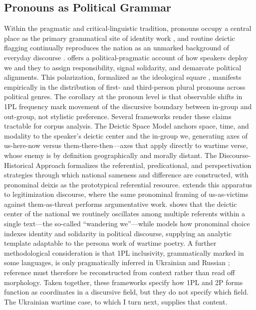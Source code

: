 \documentclass[12pt]{interact}
\theoremstyle{plain}%
\theoremstyle{definition}
\theoremstyle{remark}
\begin{document}
\subsection{Pronouns as Political Grammar}
Within the pragmatic and critical-linguistic tradition, pronouns occupy a central place as the primary grammatical site of identity work \citep{muhlhausler1990pronouns}, and routine deictic flagging continually reproduces the nation as an unmarked background of everyday discourse \citep{billig1995banal}. \citet{wilson1990politically} offers a political-pragmatic account of how speakers deploy we and they to assign responsibility, signal solidarity, and demarcate political alignments. This polarization, formalized as the ideological square \citep{vanDijk2011}, manifests empirically in the distribution of first- and third-person plural pronouns across political genres. The corollary at the pronoun level is that observable shifts in 1PL frequency mark movement of the discursive boundary between in-group and out-group, not stylistic preference.
Several frameworks render these claims tractable for corpus analysis. The Deictic Space Model \citep{chilton2004analysing} anchors space, time, and modality to the speaker's deictic center and the in-group we, generating axes of us-here-now versus them-there-then—axes that apply directly to wartime verse, whose enemy is by definition geographically and morally distant. The Discourse-Historical Approach \citep{wodak2009the} formalizes the referential, predicational, and perspectivation strategies through which national sameness and difference are constructed, with pronominal deixis as the prototypical referential resource. \citet{reyes2011strategies} extends this apparatus to legitimization discourse, where the same pronominal framing of us-as-victims against them-as-threat performs argumentative work. \citet{petersoo2007what} shows that the deictic center of the national we routinely oscillates among multiple referents within a single text—the so-called ``wandering we''—while \citet{fina1995pronominal} models how pronominal choice indexes identity and solidarity in political discourse, supplying an analytic template adaptable to the persona work of wartime poetry. A further methodological consideration is that 1PL inclusivity, grammatically marked in some languages, is only pragmatically inferred in Ukrainian and Russian \citep{cysouw2003the, filimonova2005clusivity, helmbrecht2002grammar}; reference must therefore be reconstructed from context rather than read off morphology. Taken together, these frameworks specify how 1PL and 2P forms function as coordinates in a discursive field, but they do not specify which field. The Ukrainian wartime case, to which I turn next, supplies that content.
\end{document}
